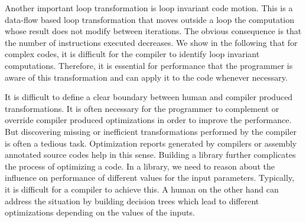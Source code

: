 Another important loop transformation is loop invariant code motion. This is a data-flow based loop transformation that moves outside a loop the computation whose result does not modify between iterations. 
The obvious consequence is that the number of instructions executed decreases. 
We show in the following that for complex codes, it is difficult for the compiler to identify loop invariant computations. Therefore, it is essential for performance that the programmer is aware of this transformation and can apply it to the code whenever necessary. 



It is difficult to define a clear boundary between human and compiler produced transformations. It is often necessary for the programmer to complement or override compiler produced optimizations in order to improve the performance. But discovering missing or inefficient transformations performed by the compiler is often a tedious task. Optimization reports  generated by compilers or assembly annotated source codes help in this sense. Building a library further complicates the process of optimizing a code. 
In a library, we need to reason about the influence on performance of different values for the input parameters. Typically, it is difficult for a compiler to achieve this. A human on the other hand can address the situation by building decision trees which lead to different optimizations depending on the values of the inputs.


